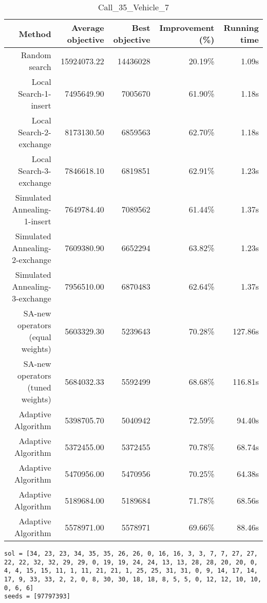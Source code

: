 \begin{table}[ht]
\centering
\caption{Call\_35\_Vehicle\_7}
\label{tab:call35vehicle7}
\begin{tabular}{|r|r|r|r|r|}
Method & Average objective & Best objective & Improvement (\%) & Running time \\
\hline
Random search & 15924073.22 & 14436028 & 20.19\% & 1.09s\\
Local Search-1-insert & 7495649.90 & 7005670 & 61.90\% & 1.18s\\
Local Search-2-exchange & 8173130.50 & 6859563 & 62.70\% & 1.18s\\
Local Search-3-exchange & 7846618.10 & 6819851 & 62.91\% & 1.23s\\
Simulated Annealing-1-insert & 7649784.40 & 7089562 & 61.44\% & 1.37s\\
Simulated Annealing-2-exchange & 7609380.90 & 6652294 & 63.82\% & 1.23s\\
Simulated Annealing-3-exchange & 7956510.00 & 6870483 & 62.64\% & 1.37s\\
SA-new operators (equal weights) & 5603329.30 & 5239643 & 70.28\% & 127.86s\\
SA-new operators (tuned weights) & 5684032.33 & 5592499 & 68.68\% & 116.81s\\
Adaptive Algorithm & 5398705.70 & 5040942 & 72.59\% & 94.40s\\
Adaptive Algorithm & 5372455.00 & 5372455 & 70.78\% & 68.74s\\
Adaptive Algorithm & 5470956.00 & 5470956 & 70.25\% & 64.38s\\
Adaptive Algorithm & 5189684.00 & 5189684 & 71.78\% & 68.56s\\
Adaptive Algorithm & 5578971.00 & 5578971 & 69.66\% & 88.46s\\
\end{tabular}%
\end{table}
\begin{lstlisting}[label={lst:call35vehicle7},caption=Optimal solution call\_35\_vehicle\_7]
sol = [34, 23, 23, 34, 35, 35, 26, 26, 0, 16, 16, 3, 3, 7, 7, 27, 27, 22, 22, 32, 32, 29, 29, 0, 19, 19, 24, 24, 13, 13, 28, 28, 20, 20, 0, 4, 4, 15, 15, 11, 1, 11, 21, 21, 1, 25, 25, 31, 31, 0, 9, 14, 17, 14, 17, 9, 33, 33, 2, 2, 0, 8, 30, 30, 18, 18, 8, 5, 5, 0, 12, 12, 10, 10, 0, 6, 6]
seeds = [97797393]
\end{lstlisting}%
\clearpage


